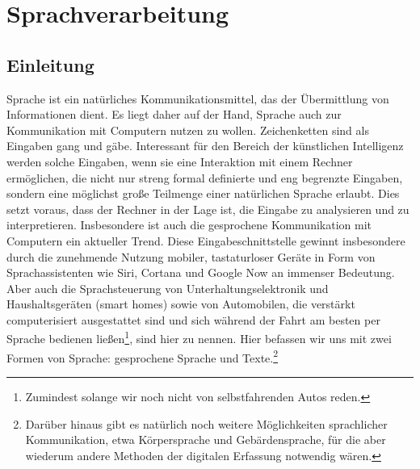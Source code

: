 
\chapter{Sprachverarbeitung}
\section{Einleitung}
Sprache ist ein natürliches Kommunikationsmittel, das der Übermittlung von Informationen dient.
Es liegt daher auf der Hand, Sprache auch zur Kommunikation mit Computern nutzen zu wollen.
Zeichenketten sind als Eingaben gang und gäbe.
Interessant für den Bereich der künstlichen Intelligenz werden solche Eingaben, wenn sie eine Interaktion mit einem Rechner ermöglichen, die nicht nur streng formal definierte und eng begrenzte Eingaben, sondern eine möglichst große Teilmenge einer natürlichen Sprache erlaubt.
Dies setzt voraus, dass der Rechner in der Lage ist, die Eingabe zu analysieren und zu interpretieren.
Insbesondere ist auch die gesprochene Kommunikation mit Computern ein aktueller Trend.
Diese Eingabeschnittstelle gewinnt insbesondere durch die zunehmende Nutzung mobiler, tastaturloser Geräte in Form von Sprachassistenten wie Siri, Cortana und Google Now an immenser Bedeutung.
Aber auch die Sprachsteuerung von Unterhaltungselektronik und Haushaltsgeräten (smart homes) sowie von Automobilen, die verstärkt computerisiert ausgestattet sind und sich während der Fahrt am besten per Sprache bedienen ließen\footnote{Zumindest solange wir noch nicht von selbstfahrenden Autos reden.}, sind hier zu nennen.
Hier befassen wir uns mit zwei Formen von Sprache: gesprochene Sprache und Texte.\footnote{Darüber hinaus gibt es natürlich noch weitere Möglichkeiten sprachlicher Kommunikation, etwa Körpersprache und Gebärdensprache, für die aber wiederum andere Methoden der digitalen Erfassung notwendig wären.}

